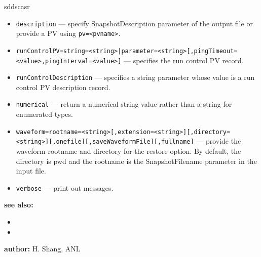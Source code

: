 \begin{sddsprog}{sddscasr}
\begin{itemize}
  \item {\tt description} --- specify SnapshotDescription parameter of the output file or provide a PV using {\tt pv=<pvname>}.
  \item {\tt runControlPV=string=<string>|parameter=<string>[,pingTimeout=<value>,pingInterval=<value>]} --- specifies the run control PV record.
  \item {\tt runControlDescription} --- specifies a string parameter whose value is a run control PV description record.
  \item {\tt numerical} --- return a numerical string value rather than a string for enumerated types.
  \item {\tt waveform=rootname=<string>[,extension=<string>][,directory=<string>][,onefile][,saveWaveformFile][,fullname]} --- provide the waveform rootname and directory for the restore option. By default, the directory is pwd and the rootname is the SnapshotFilename parameter in the input file.
  \item {\tt verbose} --- print out messages.
\end{itemize}

\item \textbf{see also:}
\begin{itemize}
  \item {}
  \item {}
\end{itemize}
\item \textbf{author:} H. Shang, ANL
\end{sddsprog}
